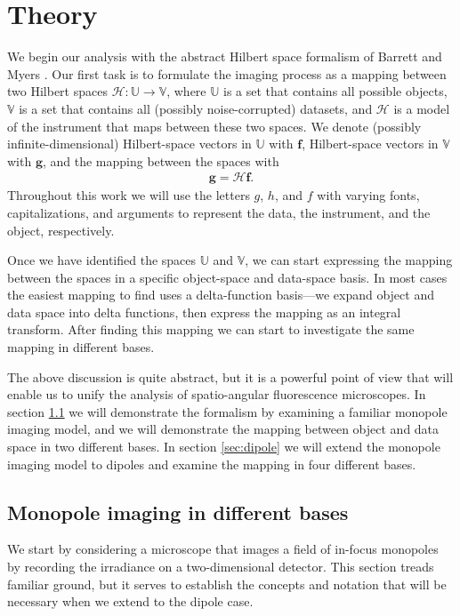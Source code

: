 \documentclass[]{osa-article}
\providecommand{\mb}[1]{\mathbf{#1}}
\providecommand{\mc}[1]{\mathcal{#1}}
\providecommand{\mbb}[1]{\mathbb{#1}}
\begin{document}
\section{Theory}\label{sec:theory}
We begin our analysis with the abstract Hilbert space formalism of Barrett and
Myers \cite[ch.~1.3]{barrett2004}. Our first task is to formulate
the imaging process as a mapping between two Hilbert spaces
$\mc{H}: \mbb{U} \rightarrow \mbb{V}$, where $\mbb{U}$ is a set that contains
all possible objects, $\mbb{V}$ is a set that contains all (possibly
noise-corrupted) datasets, and $\mc{H}$ is a model of the instrument that maps
between these two spaces. We denote (possibly infinite-dimensional)
Hilbert-space vectors in $\mbb{U}$ with $\mb{f}$, Hilbert-space vectors in
$\mbb{V}$ with $\mb{g}$, and the mapping between the spaces with
\begin{align}
  \mb{g} = \mc{H}\mb{f}.
\end{align}
Throughout this work we will use the letters $g$, $h$, and $f$ with varying
fonts, capitalizations, and arguments to represent the data, the instrument, and
the object, respectively.

Once we have identified the spaces $\mbb{U}$ and $\mbb{V}$, we can start
expressing the mapping between the spaces in a specific object-space and
data-space basis. In most cases the easiest mapping to find uses a
delta-function basis---we expand object and data space into delta functions,
then express the mapping as an integral transform. After finding this mapping we
can start to investigate the same mapping in different bases.

The above discussion is quite abstract, but it is a powerful point of view that
will enable us to unify the analysis of spatio-angular fluorescence microscopes.
In section \ref{sec:monopole} we will demonstrate the formalism by examining a
familiar monopole imaging model, and we will demonstrate the mapping between
object and data space in two different bases. In section \ref{sec:dipole} we
will extend the monopole imaging model to dipoles and examine the mapping in
four different bases.

\subsection{Monopole imaging in different bases}\label{sec:monopole}
We start by considering a microscope that images a field of in-focus monopoles
by recording the irradiance on a two-dimensional detector. This section treads
familiar ground, but it serves to establish the concepts and notation that will
be necessary when we extend to the dipole case.
\end{document}
